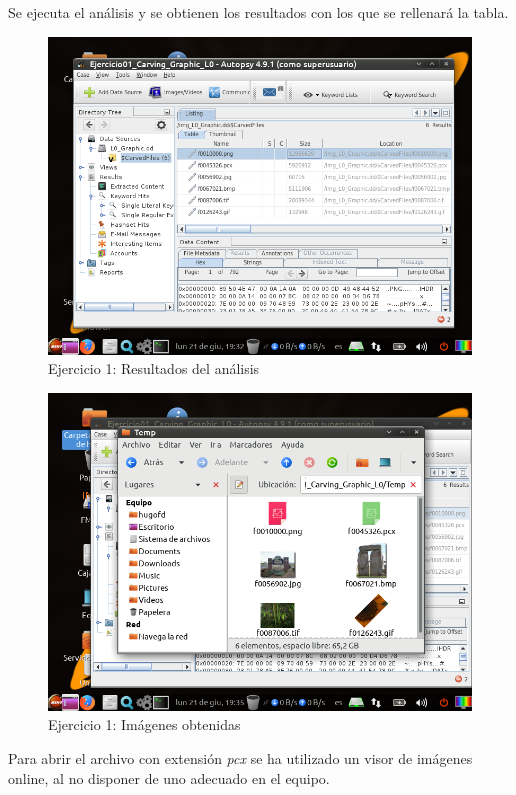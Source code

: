 \documentclass[11pt]{article}
\begin{document}
Se ejecuta el análisis y se obtienen los resultados con los que se rellenará la tabla.

\begin{figure}[H]
    \caption{Ejercicio 1: Resultados del análisis}
    \centering
    \includegraphics[scale=0.7]{e1-5.png}
\end{figure}

\begin{figure}[H]
    \caption{Ejercicio 1: Imágenes obtenidas}
    \centering
    \includegraphics[scale=0.7]{e1-6.png}
\end{figure}

Para abrir el archivo con extensión \textit{pcx} se ha utilizado un visor de imágenes online, al no disponer de uno adecuado en el equipo.
\end{document}
